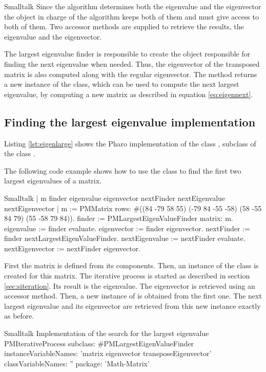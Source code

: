 \begin{displaycode}{Smalltalk}
Since the algorithm determines both the eigenvalue and the
eigenvector the object in charge of the algorithm keeps both of
them and must give access to both of them.
Two accessor methods are supplied to retrieve the results, the eigenvalue and the
eigenvector.

The largest eigenvalue finder is responsible to create the object
responsible for finding the next eigenvalue when needed.
Thus, the eigenvector of the transposed matrix is also computed along with
the regular eigenvector.
The method  returns a new instance of the class, which can be used to compute the next largest eigenvalue, by computing a new matrix as described in equation
\ref{eq:eigennext}.

\subsection{Finding the largest eigenvalue implementation}
Listing \ref{lst:eigenlarge} shows the Pharo implementation of the class , subclass of the class .

The following code example shows how to use the class to find the
first two largest eigenvalues of a matrix.
\begin{displaycode}{Smalltalk}
 | m finder eigenvalue eigenvector nextFinder nextEigenvalue nextEigenvector |
 m := PMMatrix rows: #((84 -79 58 55)
                       (-79 84 -55 -58)
                       (58 -55 84 79)
                       (55 -58 79 84)).
 finder := PMLargestEigenValueFinder matrix: m.
 eigenvalue := finder evaluate.
 eigenvector := finder eigenvector.
 nextFinder := finder nextLargestEigenValueFinder.
 nextEigenvalue := nextFinder evaluate.
 nextEigenvector := nextFinder eigenvector.
\end{displaycode}
First the matrix  is defined from its components. Then, an
instance of the class  is created
for this matrix. The iterative process is started as described in
section \ref{sec:siteration}. Its result is the eigenvalue. The
eigenvector is retrieved using an accessor method. Then, a new
instance of  is obtained from the
first one. The next largest eigenvalue and its eigenvector are
retrieved from this new instance exactly as before.

\begin{listing}[label=lst:eigenlarge]{Smalltalk}
{Implementation of the search for the largest eigenvalue}
PMIterativeProcess subclass: #PMLargestEigenValueFinder
   instanceVariableNames: 'matrix eigenvector transposeEigenvector'
   classVariableNames: ''
   package: 'Math-Matrix'
\end{listing}


\end{displaycode}

